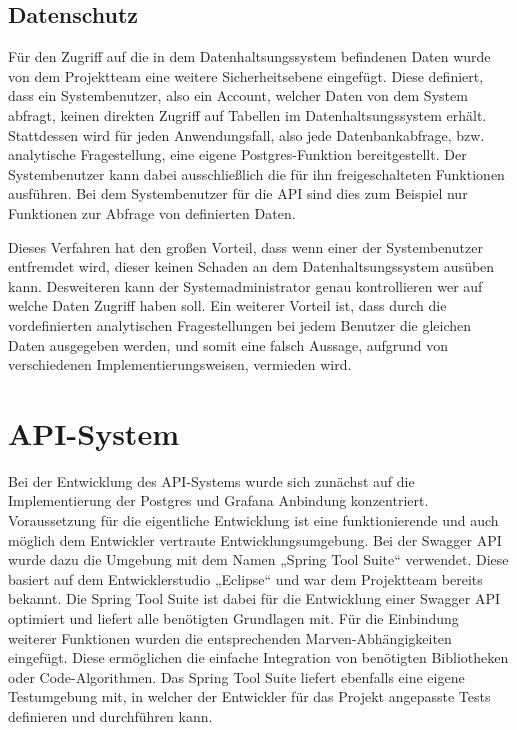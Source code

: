 \subsection{Datenschutz}
\label{subsec:postgres_datenschutz}
Für den Zugriff auf die in dem Datenhaltsungssystem befindenen Daten wurde von
dem Projektteam eine weitere Sicherheitsebene eingefügt. Diese definiert, dass
ein Systembenutzer, also ein Account, welcher Daten von dem System abfragt,
keinen direkten Zugriff auf Tabellen im Datenhaltsungssystem erhält.
Stattdessen wird für jeden Anwendungsfall, also jede Datenbankabfrage, bzw.
analytische Fragestellung, eine eigene Postgres-Funktion bereitgestellt.
Der Systembenutzer kann dabei ausschließlich die für ihn freigeschalteten
Funktionen ausführen. Bei dem Systembenutzer für die API sind dies zum Beispiel
nur Funktionen zur Abfrage von definierten Daten.

Dieses Verfahren hat den großen Vorteil, dass wenn einer der Systembenutzer
entfremdet wird, dieser keinen Schaden an dem Datenhaltsungssystem ausüben
kann. Desweiteren kann der Systemadministrator genau kontrollieren wer auf
welche Daten Zugriff haben soll. Ein weiterer Vorteil ist, dass durch die
vordefinierten analytischen Fragestellungen bei jedem Benutzer die gleichen
Daten ausgegeben werden, und somit eine falsch Aussage, aufgrund von
verschiedenen Implementierungsweisen, vermieden wird.
\nl%

\section{API-System}
\label{sec:api_system}
Bei der Entwicklung des API-Systems wurde sich zunächst auf die Implementierung
der Postgres und Grafana Anbindung konzentriert. Voraussetzung für die
eigentliche Entwicklung ist eine funktionierende und auch möglich dem
Entwickler vertraute Entwicklungsumgebung. Bei der Swagger API wurde dazu
die Umgebung mit dem Namen „Spring Tool Suite“ verwendet. Diese basiert auf
dem Entwicklerstudio „Eclipse“ und war dem Projektteam bereits bekannt. Die
Spring Tool Suite ist dabei für die Entwicklung einer Swagger API optimiert
und liefert alle benötigten Grundlagen mit. Für die Einbindung weiterer
Funktionen wurden die entsprechenden Marven-Abhängigkeiten eingefügt. Diese
ermöglichen die einfache Integration von benötigten Bibliotheken oder
Code-Algorithmen. Das Spring Tool Suite liefert ebenfalls eine eigene
Testumgebung mit, in welcher der Entwickler für das Projekt angepasste Tests
definieren und durchführen kann.

